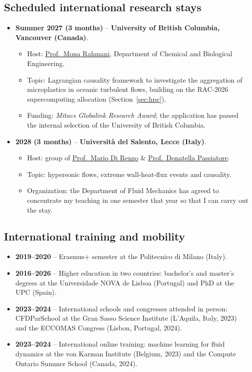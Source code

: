 \documentclass[11pt]{article}
\begin{document}
\subsection{Scheduled international research stays}\label{sec:stays-sched}
\begin{itemize}
  \item \textbf{Summer 2027 (3 months)} -- \textbf{University of British
  Columbia, Vancouver (Canada)}.
  \begin{itemize}
    \item Host: \href{https://chbe.ubc.ca/mona-rahmani/}{Prof.\ Mona Rahmani},
    Department of Chemical and Biological Engineering.
    \item Topic: Lagrangian causality framework to investigate the aggregation of
    microplastics in oceanic turbulent flows, building on the RAC-2026 supercomputing allocation (Section~\ref{sec:hpc}).
    \item Funding: \emph{Mitacs Globalink Research Award}; the application has
    passed the internal selection of the University of British Columbia.
  \end{itemize}
  \item \textbf{2028 (3 months)} -- \textbf{Universit\`a del Salento, Lecce
  (Italy)}.
  \begin{itemize}
    \item Host: group of
    \href{https://www.unisalento.it/scheda-utente/-/people/mario.direnzo}{Prof.\ Mario Di Renzo} \& \href{https://www.unisalento.it/scheda-utente/-/people/donatella.passiatore}{Prof.\ Donatella Passiatore}.
    \item Topic: hypersonic flows, extreme wall-heat-flux events and causality.
    \item Organization: the Department of Fluid Mechanics has agreed to concentrate
    my teaching in one semester that year so that I can carry out the stay.
  \end{itemize}
\end{itemize}

\subsection{International training and mobility}
\begin{itemize}
  \item \textbf{2019--2020} -- Erasmus+ semester at the Politecnico di Milano (Italy).
  \item \textbf{2016--2026} -- Higher education in two countries: bachelor's and master's
  degrees at the Universidade NOVA de Lisboa (Portugal) and PhD at the UPC (Spain).
  \item \textbf{2023--2024} -- International schools and congresses attended in person:
  CFDParSchool at the Gran Sasso Science Institute (L'Aquila, Italy, 2023) and the ECCOMAS
  Congress (Lisbon, Portugal, 2024).
  \item \textbf{2023--2024} -- International online training: machine learning for fluid
  dynamics at the von Karman Institute (Belgium, 2023) and the Compute Ontario Summer School
  (Canada, 2024).
\end{itemize}
\end{document}

